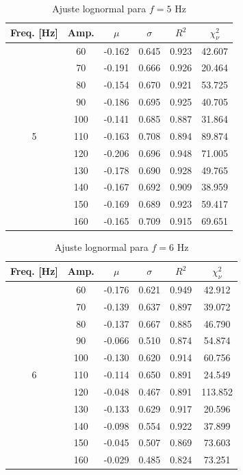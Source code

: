 \begin{table}[h!]
\centering
\begin{tabular}{c c c c c c}
\hline
Freq. [Hz] & Amp. & $\mu$ & $\sigma$ & $R^2$ & $\chi_\nu^2$\\
\hline
\multirow{11}{*}{5} & 60 & -0.162 & 0.645 & 0.923 & 42.607\\
 & 70 & -0.191 & 0.666 & 0.926 & 20.464\\
 & 80 & -0.154 & 0.670 & 0.921 & 53.725\\
 & 90 & -0.186 & 0.695 & 0.925 & 40.705\\
 & 100 & -0.141 & 0.685 & 0.887 & 31.864\\
 & 110 & -0.163 & 0.708 & 0.894 & 89.874\\
 & 120 & -0.206 & 0.696 & 0.948 & 71.005\\
 & 130 & -0.178 & 0.690 & 0.928 & 49.765\\
 & 140 & -0.167 & 0.692 & 0.909 & 38.959\\
 & 150 & -0.169 & 0.689 & 0.923 & 59.417\\
 & 160 & -0.165 & 0.709 & 0.915 & 69.651\\
\hline
\end{tabular}
\caption{Ajuste lognormal para $f=5$ Hz}
\end{table}

\begin{table}[h!]
\centering
\begin{tabular}{c c c c c c}
\hline
Freq. [Hz] & Amp. & $\mu$ & $\sigma$ & $R^2$ & $\chi_\nu^2$\\
\hline
\multirow{11}{*}{6} & 60 & -0.176 & 0.621 & 0.949 & 42.912\\
 & 70 & -0.139 & 0.637 & 0.897 & 39.072\\
 & 80 & -0.137 & 0.667 & 0.885 & 46.790\\
 & 90 & -0.066 & 0.510 & 0.874 & 54.874\\
 & 100 & -0.130 & 0.620 & 0.914 & 60.756\\
 & 110 & -0.114 & 0.650 & 0.891 & 24.549\\
 & 120 & -0.048 & 0.467 & 0.891 & 113.852\\
 & 130 & -0.133 & 0.629 & 0.917 & 20.596\\
 & 140 & -0.098 & 0.554 & 0.922 & 37.899\\
 & 150 & -0.045 & 0.507 & 0.869 & 73.603\\
 & 160 & -0.029 & 0.485 & 0.824 & 73.251\\
\hline
\end{tabular}
\caption{Ajuste lognormal para $f=6$ Hz}
\end{table}

